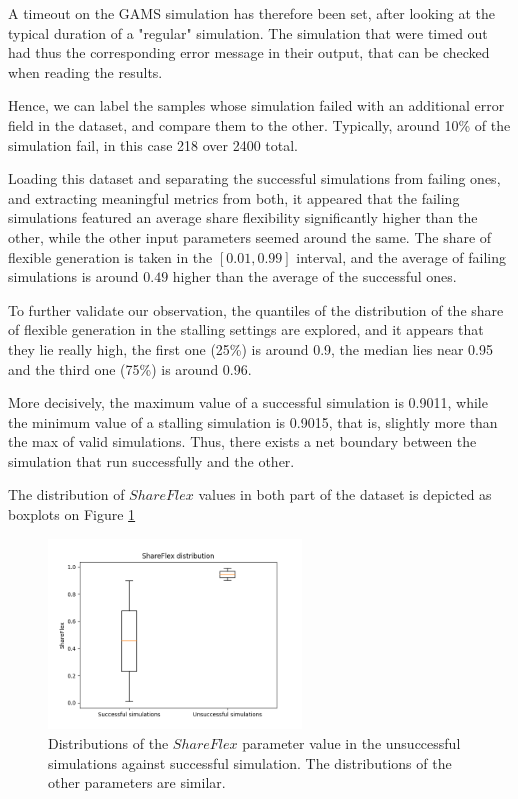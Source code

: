 A timeout on the GAMS simulation has therefore been set, after looking at the typical duration of a "regular" simulation. The simulation that were timed out had thus the corresponding error message in their output, that can be checked when reading the results.

Hence, we can label the samples whose simulation failed with an additional error field in the dataset, and compare them to the other. Typically, around 10\% of the simulation fail, in this case 218 over 2400 total.

Loading this dataset and separating the successful simulations from failing ones, and extracting meaningful metrics from both, it appeared that the failing simulations featured an average share flexibility significantly higher than the other, while the other input parameters seemed around the same. The share of flexible generation is taken in the $[0.01, 0.99]$ interval, and the average of failing simulations is around $0.49$ higher than the average of the successful ones.

To further validate our observation, the quantiles of the distribution of the share of flexible generation in the stalling settings are explored, and it appears that they lie really high, the first one (25\%) is around 0.9, the median lies near 0.95 and the third one (75\%) is around 0.96. 

More decisively, the maximum value of a successful simulation is 0.9011, while the minimum value of a stalling simulation is 0.9015, that is, slightly more than the max of valid simulations. Thus, there exists a net boundary between the simulation that run successfully and the other. 

The distribution of $ShareFlex$ values in both part of the dataset is depicted as boxplots on Figure \ref{fig:stalling-simulations}

\begin{figure}[h]
    \centering
    \includegraphics[width=0.6\textwidth]{resources/images/share-flex-boxplots.png}
    \caption{Distributions of the $ShareFlex$ parameter value in the unsuccessful simulations against successful simulation. The distributions of the other parameters are similar.}
    \label{fig:stalling-simulations}
\end{figure}

